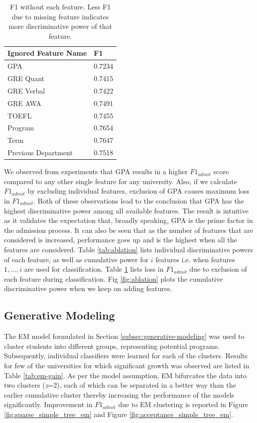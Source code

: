 \documentclass{sig-alternate-05-2015}
\begin{document}
\begin{table}[t]
\centering
\caption{F1 without each feature. Less F1 due to missing feature indicates more discriminative power of that feature.}
\label{tab:ablation-2}
\begin{tabular}{p{4.0 cm} p{1.3 cm}} \\
Ignored Feature Name & F1 \\ \hline
GPA & 0.7234 \\ \hline
GRE Quant & 0.7415 \\ \hline
GRE Verbal & 0.7422 \\ \hline
GRE AWA & 0.7491 \\ \hline
TOEFL & 0.7455 \\ \hline
Program & 0.7654 \\ \hline
Term & 0.7647 \\ \hline
Previous Department & 0.7518 \\ \hline
\end{tabular}
\end{table}

We observed from experiments that GPA results in a higher $F1_{admit}$ score compared to any other single feature for any university. Also, if we calculate $F1_{admit}$ by excluding individual features, exclusion of GPA causes maximum loss in $F1_{admit}$. Both of these observations lead to the conclusion that GPA has the highest discriminative power among all available features. The result is intuitive as it validates the expectation that, broadly speaking, GPA is the prime factor in the admission process. It can also be seen that as the number of features that are considered is increased, performance goes up and is the highest when all the features are considered. Table \ref{tab:ablation} lists individual discriminative powers of each feature, as well as cumulative power for $i$ features i.e. when features ${1,...,i}$ are used for classification. Table \ref{tab:ablation-2} lists loss in $F1_{admit}$ due to exclusion of each feature during classification. Fig \ref{fig:ablation} plots the cumulative discriminative power when we keep on adding features.


\subsection{Generative Modeling}
\label{subsec:em-exp}
The EM model formulated in Section \ref{subsec:generative-modeling} was used to cluster students into different groups, representing potential programs. Subsequently, individual classifiers were learned for each of the clusters. Results for few of the universities for which significant growth was observed are listed in Table \ref{tab:em-gain}. As per the model assumption, EM bifurcates the data into two clusters (\textit{z}=2), each of which can be separated in a better way than the earlier cumulative cluster thereby increasing the performance of the models significantly. Improvement in $F1_{admit}$ due to EM clustering is reported in Figure \ref{fig:sparse_simple_tree_em} and Figure \ref{fig:acceptance_simple_tree_em}.
\end{document}
